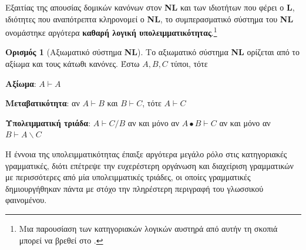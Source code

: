 \documentclass [a4paper,11pt] {book}
\theoremstyle{definition}
\theoremstyle{definition}
\newtheorem{definition}[theorem]{Ορισμός}
\begin{document}
Εξαιτίας της απουσίας δομικών κανόνων στον \textbf{NL} και των ιδιοτήτων που φέρει ο \textbf{L}, ιδιότητες που αναπότρεπτα κληρονομεί ο \textbf{NL}, το συμπερασματικό σύστημα του \textbf{NL} ονομάστηκε αργότερα \textbf{καθαρή λογική υπολειμματικότητας}.\footnote{Μια παρουσίαση των κατηγοριακών λογικών αυστηρά από αυτήν τη σκοπιά μπορεί να βρεθεί στο \citep{Areces:Bernardi:04a}.}
\begin{definition}[Αξιωματικό σύστημα \textbf{NL}]
\label{AxiomaticSystemNL}
Το αξιωματικό σύστημα \textbf{NL} ορίζεται από το αξίωμα και τους κάτωθι κανόνες. Έστω $A,B,C$ τύποι, τότε

\textbf{Αξίωμα}: $A\vdash A$

\textbf{Μεταβατικότητα}: αν $A\vdash B$ και $B \vdash C$, τότε $A\vdash C$

\textbf{Υπολειμματική τριάδα}: $A\vdash C/B$ αν και μόνο αν $A\bullet B \vdash C$ αν και μόνο αν $B\vdash A\backslash C$
\end{definition}
Η έννοια της υπολειμματικότητας έπαιξε αργότερα μεγάλο ρόλο στις κατηγοριακές γραμματικές, διότι επέτρεψε την ευχερέστερη οργάνωση και διαχείριση γραμματικών με περισσότερες από μία υπολειμματικές τριάδες, οι οποίες γραμματικές δημιουργήθηκαν πάντα με στόχο την πληρέστερη περιγραφή του γλωσσικού φαινομένου.
\end{document}
